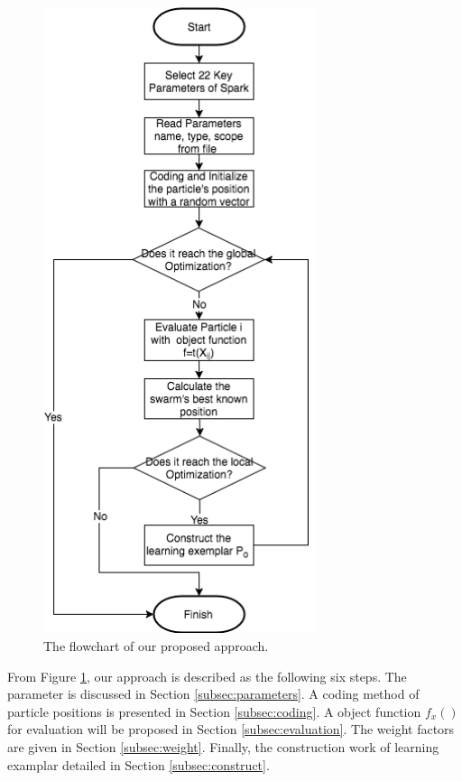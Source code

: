 \begin{figure}\center
	\includegraphics[width=8cm]{flowchart.png}
	\caption{The flowchart of our proposed approach.}\label{fig:flowchart}
\end{figure}
\par From Figure \ref{fig:flowchart}, our approach is described as the following six steps. The parameter is discussed in Section \ref{subsec:parameters}. A coding method of particle positions is presented in Section \ref{subsec:coding}. A object function $f_x()$ for evaluation will be proposed in Section \ref{subsec:evaluation}. The weight factors are given in Section \ref{subsec:weight}. Finally, the construction work of learning examplar detailed in Section \ref{subsec:construct}.
